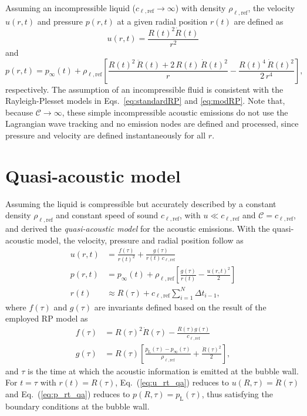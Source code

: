 Assuming an incompressible liquid ($c_{\ell,\mathrm{ref}} \rightarrow  \infty$) with density $\rho_{\ell,\mathrm{ref}}$, the velocity $u(r,t)$ and pressure $p(r,t)$ at a given radial position $r(t)$ are defined as \citep{Neppiras1980}
\begin{equation}
    u(r,t) = \frac{R(t)^2 \dot{R}(t)}{r^2}  \label{eq:u_rt_incomp} 
\end{equation}
and 
\begin{equation}
    p(r,t) = p_\infty(t) + \rho_{\ell,\mathrm{ref}} \left[\frac{R(t)^2 \, \ddot{R}(t) + 2 \, R(t) \, \dot{R}(t)^2}{r} - \frac{R(t)^4 \, \dot{R}(t)^2}{2 \, r^4} \right], \label{eq:p_rt_incomp}
\end{equation}
respectively. The assumption of an incompressible fluid is consistent with the Rayleigh-Plesset models in Eqs.~\eqref{eq:standardRP} and \eqref{eq:modRP}. Note that, because $\mathcal{C} \rightarrow \infty$, these simple incompressible acoustic emissions do not use the Lagrangian wave tracking and no emission nodes are defined and processed, since pressure and velocity are defined instantaneously for all $r$.

\section{Quasi-acoustic model}
\label{sec:emissionsqa}

Assuming the liquid is compressible but accurately described by a constant density $\rho_{\ell,\mathrm{ref}}$ and constant speed of sound $c_{\ell,\mathrm{ref}}$, with $u \ll c_{\ell,\mathrm{ref}}$ and $\mathcal{C} = c_{\ell,\mathrm{ref}}$, \citet{Trilling1952} and \citet{Gilmore1952} derived the {\it quasi-acoustic model} for the acoustic emissions. With the quasi-acoustic model, the velocity, pressure and radial position follow as
\begin{align}
    u(r,t) &= \frac{f(\tau)}{r(t)^2} + \frac{g(\tau)}{r(t) \, c_{\ell,\mathrm{ref}}}  \label{eq:u_rt_qa} \\
  p(r,t) &=  p_\infty(t) + \rho_{\ell,\mathrm{ref}} \left[ \frac{g(\tau)}{r(t)} - \frac{u(r,t)^2}{2} \right] \label{eq:p_rt_qa} \\
  r(t) &\approx R(\tau) + c_{\ell,\mathrm{ref}} \sum_{i=1}^N \Delta t_{i-1}, \label{eq:r_t_qa}
\end{align}
where $f(\tau)$ and $g(\tau)$ are invariants defined based on the result of the employed RP model as
\begin{align}
    f(\tau) &= R(\tau)^2 \dot{R}(\tau) - \frac{R(\tau) g(\tau)}{c_{\ell,\mathrm{ref}}}\\
    g(\tau) &= R(\tau) \left[\frac{p_\mathrm{L}(\tau)-p_\infty(\tau)}{\rho_{\ell,\mathrm{ref}}} + \frac{\dot{R}(\tau)^2}{2} \right], \label{eq:g_qa}
\end{align}
and $\tau$ is the time at which the acoustic information is emitted at the bubble wall. For $t=\tau$ with $r(t)=R(\tau)$, Eq.~(\ref{eq:u_rt_qa}) reduces to $u(R,\tau)=\dot{R}(\tau)$ and Eq.~(\ref{eq:p_rt_qa}) reduces to $p(R,\tau)=p_\mathrm{L}(\tau)$, thus satisfying the boundary conditions at the bubble wall. 

